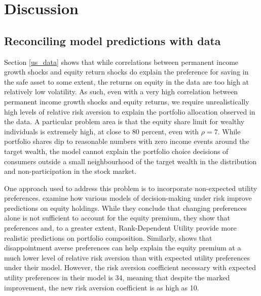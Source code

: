 \section{Discussion}\label{discussion}

\subsection{Reconciling model predictions with data}\label{reconciliation}

Section \ref{us_data} shows that while correlations between permanent income growth shocks and equity return shocks do explain the preference for saving in the safe asset to some extent, the returns on equity in the data are too high at relatively low volatility. As such, even with a very high correlation between permanent income growth shocks and equity returns, we require unrealistically high levels of relative risk aversion to explain the portfolio allocation observed in the data. A particular problem area is that the equity share limit for wealthy individuals is extremely high, at close to 80 percent, even with $\rho = 7$. While portfolio shares dip to reasonable numbers with zero income events around the target wealth, the model cannot explain the portfolio choice decisions of consumers outside a small neighbourhood of the target wealth in the distribution and non-participation in the stock market.

One approach used to address this problem is to incorporate non-expected utility preferences. \citet{Haliassos2001} examine how various models of decision-making under risk improve predictions on equity holdings. While they conclude that changing preferences alone is not sufficient to account for the equity premium, they show that \citet{Kreps1978} preferences and, to a greater extent, Rank-Dependent Utility \citep{Quiggin1982} provide more realistic predictions on portfolio composition. Similarly, \citet{Schreindorfer2020} shows that disappointment averse preferences \citep{Gul1991, Routledge2010} can help explain the equity premium at a much lower level of relative risk aversion than with expected utility preferences under their model. However, the risk aversion coefficient necessary with expected utility preferences in their model is 34, meaning that despite the marked improvement, the new risk aversion coefficient is as high as 10.

